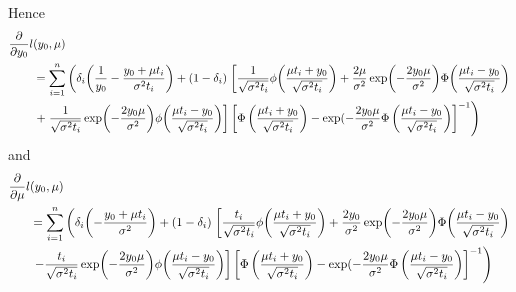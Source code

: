 Hence
\begin{align}
\begin{split}
\frac{\partial}{\partial y_0}
l&(y_0, \mu) \\
&=\sum_{i=1}^n\left(
\di\p*{\frac{1}{y_0}-\frac{y_0+\mu\ti}{\sigma^2\ti}}
+(1-\di)\right.\left[
    \frac{1}{\sqrt{\sigma^2\ti}}\phi\p*{\frac{\mu\ti+y_0}{\sqrt{\sigma^2\ti}}}+\frac{2\mu}{\sigma^2}\exp\p*{-\frac{2y_0\mu}{\sigma^2}}\Phi\p*{\frac{\mu\ti-y_0}{\sqrt{\sigma^2\ti}}}\right.\\
    &\left.+\left.
    \frac{1}{\sqrt{\sigma^2\ti}}\exp\p*{-\frac{2y_0\mu}{\sigma^2}}\phi\p*{\frac{\mu\ti-y_0}{\sqrt{\sigma^2\ti}}}
\right]\left[ \Phi\left(\frac{\mu t_i + y_0}{\sqrt{\sigma^2 t_i}}\right)-\exp(-\frac{2y_0\mu}{\sigma^2}\Phi\left(\frac{\mu t_i - y_0}{\sqrt{\sigma^2 t_i}}\right)\right]^{-1}\right)
\end{split}
\end{align}
and
\begin{align}
\begin{split}
\frac{\partial}{\partial \mu}
l&(y_0, \mu) \\
&=\sum_{i=1}^n\left(
\di\p*{-\frac{y_0+\mu\ti}{\sigma^2}}
+(1-\di)\right.\left[
\frac{\ti}{\sqrt{\sigma^2\ti}}\phi\p*{\frac{\mu\ti+y_0}{\sqrt{\sigma^2\ti}}}+\frac{2y_0}{\sigma^2}\exp\p*{-\frac{2y_0\mu}{\sigma^2}}\Phi\p*{\frac{\mu\ti-y_0}{\sqrt{\sigma^2\ti}}} \right.\\
&\left.\left.-\frac{\ti}{\sqrt{\sigma^2\ti}}\exp\p*{-\frac{2y_0\mu}{\sigma^2}}\phi\p*{\frac{\mu\ti-y_0}{\sqrt{\sigma^2\ti}}}
\right]\left[ \Phi\left(\frac{\mu t_i + y_0}{\sqrt{\sigma^2 t_i}}\right)-\exp(-\frac{2y_0\mu}{\sigma^2}\Phi\left(\frac{\mu t_i - y_0}{\sqrt{\sigma^2 t_i}}\right)\right]^{-1}\right)
\end{split}
\end{align}